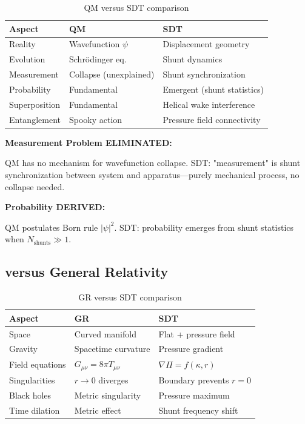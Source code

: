 \begin{table}[h]
\centering
\begin{tabular}{|l|l|l|}
\hline
\textbf{Aspect} & \textbf{QM} & \textbf{SDT} \\
\hline
Reality & Wavefunction $\psi$ & Displacement geometry \\
Evolution & Schrödinger eq. & Shunt dynamics \\
Measurement & Collapse (unexplained) & Shunt synchronization \\
Probability & Fundamental & Emergent (shunt statistics) \\
Superposition & Fundamental & Helical wake interference \\
Entanglement & Spooky action & Pressure field connectivity \\
\hline
\end{tabular}
\caption{QM versus SDT comparison}
\end{table}

\textbf{Measurement Problem ELIMINATED:}

QM has no mechanism for wavefunction collapse. SDT: "measurement" is shunt synchronization between system and apparatus—purely mechanical process, no collapse needed.

\textbf{Probability DERIVED:}

QM postulates Born rule $|\psi|^2$. SDT: probability emerges from shunt statistics when $N_{\text{shunts}} \gg 1$.

\subsection{versus General Relativity}

\begin{table}[h]
\centering
\begin{tabular}{|l|l|l|}
\hline
\textbf{Aspect} & \textbf{GR} & \textbf{SDT} \\
\hline
Space & Curved manifold & Flat + pressure field \\
Gravity & Spacetime curvature & Pressure gradient \\
Field equations & $G_{\mu\nu} = 8\pi T_{\mu\nu}$ & $\nabla \Pi = f(\kappa, r)$ \\
Singularities & $r \to 0$ diverges & Boundary prevents $r=0$ \\
Black holes & Metric singularity & Pressure maximum \\
Time dilation & Metric effect & Shunt frequency shift \\
\hline
\end{tabular}
\caption{GR versus SDT comparison}
\end{table}

